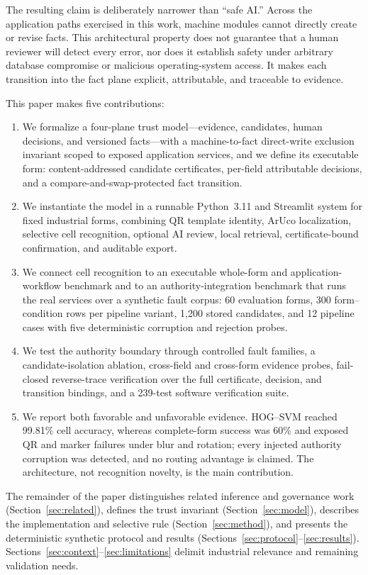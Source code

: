 The resulting claim is deliberately narrower than ``safe AI.'' Across the application paths exercised in this work, machine modules cannot directly create or revise facts. This architectural property does not guarantee that a human reviewer will detect every error, nor does it establish safety under arbitrary database compromise or malicious operating-system access. It makes each transition into the fact plane explicit, attributable, and traceable to evidence.

This paper makes five contributions:
\begin{enumerate}
  \item We formalize a four-plane trust model---evidence, candidates, human decisions, and versioned facts---with a machine-to-fact direct-write exclusion invariant scoped to exposed application services, and we define its executable form: content-addressed candidate certificates, per-field attributable decisions, and a compare-and-swap-protected fact transition.
  \item We instantiate the model in a runnable Python~3.11 and Streamlit system for fixed industrial forms, combining QR template identity, ArUco localization, selective cell recognition, optional AI review, local retrieval, certificate-bound confirmation, and auditable export.
  \item We connect cell recognition to an executable whole-form and application-workflow benchmark and to an authority-integration benchmark that runs the real services over a synthetic fault corpus: 60 evaluation forms, 300 form--condition rows per pipeline variant, 1,200 stored candidates, and 12 pipeline cases with five deterministic corruption and rejection probes.
  \item We test the authority boundary through controlled fault families, a candidate-isolation ablation, cross-field and cross-form evidence probes, fail-closed reverse-trace verification over the full certificate, decision, and transition bindings, and a 239-test software verification suite.
  \item We report both favorable and unfavorable evidence. HOG--SVM reached 99.81\% cell accuracy, whereas complete-form success was 60\% and exposed QR and marker failures under blur and rotation; every injected authority corruption was detected, and no routing advantage is claimed. The architecture, not recognition novelty, is the main contribution.
\end{enumerate}

The remainder of the paper distinguishes related inference and governance work (Section~\ref{sec:related}), defines the trust invariant (Section~\ref{sec:model}), describes the implementation and selective rule (Section~\ref{sec:method}), and presents the deterministic synthetic protocol and results (Sections~\ref{sec:protocol}--\ref{sec:results}). Sections~\ref{sec:context}--\ref{sec:limitations} delimit industrial relevance and remaining validation needs.
